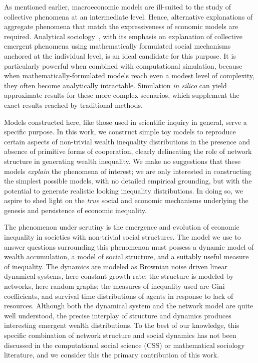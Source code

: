\documentclass[sigconf]{acmart}
\begin{document}
As mentioned earlier, macroeconomic models are ill-suited to the study of collective phenomena at an intermediate level. Hence, alternative explanations of aggregate phenomena that match the expressiveness of economic models are required. Analytical sociology~\cite{ch1as_hdbk}, with its emphasis on explanation of collective emergent phenomena using mathematically formulated social mechanisms~\cite{ch2as_hdbk,ch11as_hdbk} anchored at the individual level, is an ideal candidate for this purpose. It is particularly powerful when combined with computational simulation, because when mathematically-formulated models reach even a modest level of complexity, they often become analytically intractable. Simulation \textit{in silico} can yield approximate results for these more complex scenarios, which supplement the exact results reached by traditional methods.

Models constructed here, like those used in scientific inquiry in general, serve a specific purpose. In this work, we construct simple toy models to reproduce certain aspects of non-trivial wealth inequality distributions in the presence and absence of primitive forms of cooperation, clearly delineating the role of network structure in generating wealth inequality. We make no suggestions that these models \textit{explain} the phenomena of interest; we are only interested in constructing the simplest possible models, with no detailed empirical grounding, but with the potential to generate realistic looking inequality distributions. In doing so, we aspire to shed light on the \textit{true} social and economic mechanisms underlying the genesis and persistence of economic inequality. 


\label{giniKindaSucks}
The phenomenon under scrutiny is the emergence and evolution of economic inequality in societies with non-trivial social structures. The model we use to answer questions surrounding this phenomenon must possess a dynamic model of wealth accumulation, a model of social structure, and a suitably useful measure of inequality. The dynamics are modeled as Brownian noise driven linear dynamical systems, here constant growth rate; the structure is modeled by networks, here random graphs; the measures of inequality used are Gini coefficients, and survival time distributions of agents in response to lack of resources. Although both the dynamical system and the network model are quite well understood, the precise interplay of structure and dynamics produces interesting emergent wealth distributions. To the best of our knowledge, this specific combination of network structure and social dynamics has not been discussed in the computational social science (CSS) or mathematical sociology literature, and we consider this the primary contribution of this work. 
\end{document}
